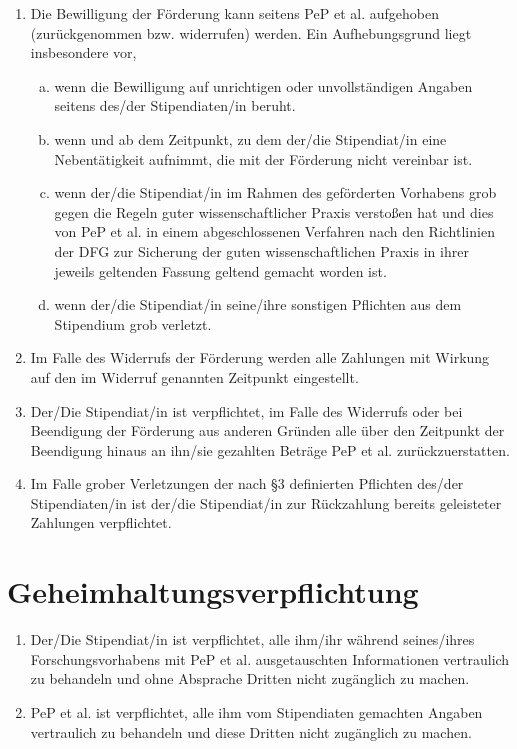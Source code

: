 \documentclass[
  paper=a4,
  fontsize=12pt,
  DIV=16,
  parskip=full,
  headinclude=true,
]{scrartcl}
\begin{document}
\begin{enumerate}[\qquad(1)]
  \item Die Bewilligung der Förderung kann seitens PeP et al. aufgehoben
    (zurückgenommen bzw. widerrufen) werden. Ein Aufhebungsgrund
    liegt insbesondere vor,
    \begin{enumerate}[(a)]
      \item wenn die Bewilligung auf unrichtigen oder
        unvollständigen Angaben seitens des/der
        Stipendiaten/in beruht.
      \item wenn und ab dem Zeitpunkt, zu dem der/die Stipendiat/in
        eine Nebentätigkeit aufnimmt, die mit der Förderung
        nicht vereinbar ist.
      \item wenn der/die Stipendiat/in im Rahmen des geförderten
        Vorhabens grob gegen die Regeln guter wissenschaftlicher
        Praxis verstoßen hat und dies von PeP et al. in einem
        abgeschlossenen Verfahren nach den Richtlinien
        der DFG zur Sicherung der guten wissenschaftlichen
        Praxis in ihrer jeweils geltenden Fassung geltend
        gemacht worden ist.
      \item wenn der/die Stipendiat/in seine/ihre sonstigen Pflichten
        aus dem Stipendium grob verletzt.
    \end{enumerate}
  \item Im Falle des Widerrufs der Förderung werden alle Zahlungen mit Wirkung
    auf den im Widerruf genannten Zeitpunkt eingestellt.
  \item Der/Die Stipendiat/in ist verpflichtet, im Falle des Widerrufs oder
    bei Beendigung der Förderung aus anderen Gründen alle über den
    Zeitpunkt der Beendigung hinaus an ihn/sie gezahlten Beträge
    PeP et al. zurückzuerstatten.
  \item Im Falle grober Verletzungen der nach §3 definierten Pflichten
    des/der Stipendiaten/in ist der/die Stipendiat/in zur Rückzahlung
    bereits geleisteter Zahlungen verpflichtet.
\end{enumerate}

\section{Geheimhaltungsverpflichtung}

\begin{enumerate}[\qquad(1)]
  \item Der/Die Stipendiat/in ist verpflichtet, alle ihm/ihr während
    seines/ihres Forschungsvorhabens mit PeP et al. ausgetauschten
    Informationen vertraulich zu behandeln und ohne Absprache
    Dritten nicht zugänglich zu machen.
  \item PeP et al. ist verpflichtet, alle ihm vom Stipendiaten gemachten
    Angaben vertraulich zu behandeln und diese Dritten nicht
    zugänglich zu machen.
\end{enumerate}
\end{document}
